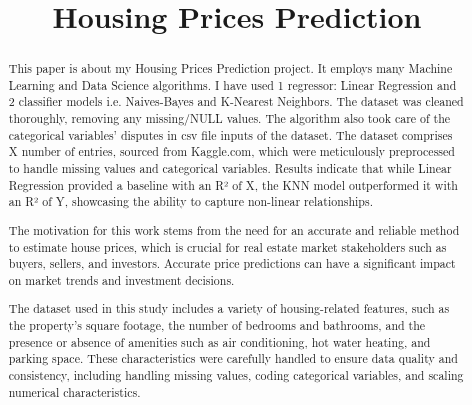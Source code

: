 \documentclass[10pt,conference,compsoc]{IEEEtran}
\begin{document}
\title{Housing Prices Prediction}

\author{



\maketitle

\begin{abstract}
This paper is about my Housing Prices Prediction project. It employs many Machine Learning and Data Science algorithms. I have used 1 regressor: Linear Regression and 2 classifier models i.e. Naives-Bayes and K-Nearest Neighbors. The dataset was cleaned thoroughly, removing any missing/NULL values. The algorithm also took care of the categorical variables' disputes in csv file inputs of the dataset. The dataset comprises X number of entries, sourced from Kaggle.com, which were meticulously preprocessed to handle missing values and categorical variables. Results indicate that while Linear Regression provided a baseline with an R² of X, the KNN model outperformed it with an R² of Y, showcasing the ability to capture non-linear relationships.


The motivation for this work stems from the need for an accurate and reliable method to estimate house prices, which is crucial for real estate market stakeholders such as buyers, sellers, and investors. Accurate price predictions can have a significant impact on market trends and investment decisions.

The dataset used in this study includes a variety of housing-related features, such as the property's square footage, the number of bedrooms and bathrooms, and the presence or absence of amenities such as air conditioning, hot water heating, and parking space. These characteristics were carefully handled to ensure data quality and consistency, including handling missing values, coding categorical variables, and scaling numerical characteristics.


\end{abstract}}
\end{document}
